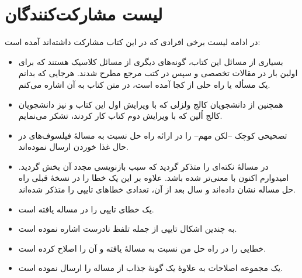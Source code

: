 \documentclass{book}
\begin{document}
\section*{لیست مشارکت‌کنندگان}

در ادامه لیست برخی افرادی که در این کتاب مشارکت داشته‌اند آمده است:

\begin{itemize}

\item    
    بسیاری از مسائل این کتاب، گونه‌های دیگری از مسائل کلاسیک هستند که برای اولین بار در مقالات تخصصی و سپس در کتب مرجع مطرح شدند. 
    هرجایی که بدانم یک مسأله یا راه حلی از کجا آمده است، در متن کتاب به آن اشاره می‌کنم.  

\item 
    همچنین از دانشجویان کالج ولزلی که با ویرایش اول این کتاب و نیز دانشجویان کالج اُلین
    که با ویرایش دوم کتاب  کار کردند، تشکر می‌نمایم. 

\item 
    تصحیحی کوچک --لکن مهم-- را در ارائه راه حل  نسبت به مسالهٔ فیلسوف‌های در حال غذا خوردن ارسال نموده‌اند.

\item {}
    در مسالهٔ  نکته‌ای را متذکر گردید که سبب بازنویسی مجدد آن بخش گردید. 
    امیدوارم اکنون با معنی‌تر شده باشد. 
    علاوه بر این  یک خطا را در نسخهٔ قبلی راه حل مساله  نشان داده‌اند و سال بعد از آن، 
    تعدادی خطاهای تایپی را متذکر شده‌اند. 
    
\item {}
    یک خطای تایپی را در مساله  یافته است. 

\item {}
    به چندین اشکال تایپی از جمله تلفظ نادرست  اشاره نموده است.

\item {}
    خطایی را در راه حل من نسبت به مسالهٔ  یافته و آن را اصلاح کرده است. 


\item {}
    یک مجموعه اصلاحات به علاوهٔ یک گونهٔ جذاب از مساله  را ارسال نموده است. 
    
    


\end{itemize}
\end{document}

